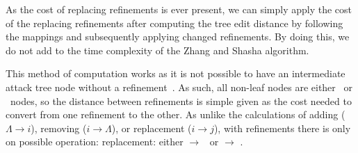As the cost of replacing refinements is ever present, we can simply apply the cost of the replacing refinements after computing the tree edit distance by following the mappings and subsequently applying changed refinements. By doing this, we do not add to the time complexity of the Zhang and Shasha algorithm.

This method of computation works as it is not possible to have an intermediate attack tree node without a refinement~\cite{mauw_foundations_2006}. As such, all non-leaf nodes are either \AND\ or \OR\ nodes, so the distance between refinements is simple given as the cost needed to convert from one refinement to the other. As unlike the calculations of adding ($\Lambda \rightarrow i$), removing ($i \rightarrow \Lambda$), or replacement ($i \rightarrow j$), with refinements there is only on possible operation: replacement: either \AND $\rightarrow$ \OR\ or \OR $\rightarrow$ \AND.






